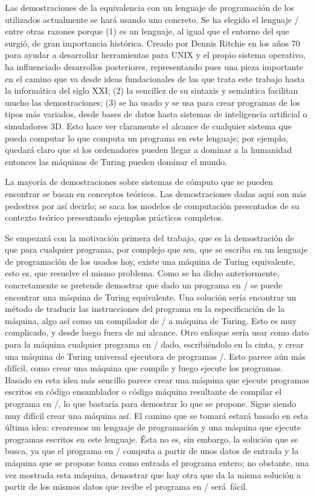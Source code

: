 Las demostraciones de la equivalencia con un lenguaje de programación de los utilizados actualmente
se hará usando uno concreto. Se ha elegido el lenguaje \C/ entre otras razones porque (1) es un
lenguaje, al igual que el entorno del que surgió, de gran importancia histórica. Creado por Dennis
Ritchie en los años 70 para ayudar a desarrollar herramientas para UNIX y el propio sistema
operativo, ha influenciado desarrollos posteriores, representando pues una pieza importante en el
camino que va desde ideas fundacionales de las que trata este trabajo hasta la informática del siglo
XXI; (2) la sencillez de su sintaxis y semántica facilitan mucho las demostraciones; (3) se ha usado
y se usa para crear programas de los tipos más variados, desde bases de datos hasta sistemas de
inteligencia artificial o simuladores 3D. Esto hace ver claramente el alcance de cualquier sistema
que pueda computar lo que computa un programa en este lenguaje; por ejemplo, quedará claro que si
los ordenadores pueden llegar a dominar a la humanidad entonces las máquinas de Turing pueden
dominar el mundo.

La mayoría de demostraciones sobre sistemas de cómputo que se pueden encontrar se basan en conceptos
teóricos. Las demostraciones dadas aquí son más pedestres por así decirlo; se saca los modelos de
computación presentados de su contexto teórico presentando ejemplos prácticos completos.

Se empezará con la motivación primera del trabajo, que es la demostración de que para cualquier
programa, por complejo que sea, que se escriba en un lenguaje de programación de los usados hoy,
existe una máquina de Turing equi\-valente, esto es, que resuelve el mismo problema. Como se ha dicho
anteriormente, con\-cretamente se pretende demostrar que dado un programa en \C/ se puede encontrar
una máquina de Turing equivalente.  Una solución sería encontrar un método de traducir las
instrucciones del programa en la especificación de la máquina, algo así como un compilador de \C/ a
máquina de Turing. Esto es muy complicado, y desde luego fuera de mi alcance. Otro enfoque sería
usar como dato para la máquina cualquier programa en \C/ dado, escribiéndolo en la cinta, y crear
una máquina de Turing universal ejecutora de programas \C/. Esto parece aún más difícil, como crear
una máquina que compile y luego ejecute los programas. Basado en esta idea más sencillo parece crear
una máquina que ejecute programas escritos en código ensamblador o código máquina resultante de
compilar el programa en \C/, lo que bastaría para demostrar lo que se propone. Sigue siendo muy
difícil crear una máquina así. El camino que se tomará estará basado en esta última idea: crearemos
un lenguaje de programación y una máquina que ejecute programas escritos en este lenguaje. Ésta no
es, sin embargo, la solución que se busca, ya que el programa en \C/ computa a partir de unos datos
de entrada y la máquina que se propone toma como entrada el programa entero; no obstante, una vez
mostrada esta máquina, demostrar que hay otra que da la misma solución a partir de los mismos datos
que recibe el programa en \C/ será\nobreak\ fácil.

